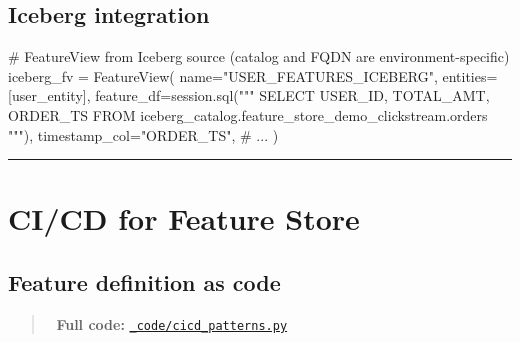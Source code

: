 \documentclass[
  letterpaper,
  DIV=11,
  numbers=noendperiod]{scrreprt}
\newenvironment{Shaded}{\begin{snugshade}}{\end{snugshade}}
\newcommand{\CommentTok}[1]{\textcolor[rgb]{0.37,0.37,0.37}{#1}}
\newcommand{\NormalTok}[1]{\textcolor[rgb]{0.00,0.23,0.31}{#1}}
\newcommand{\OperatorTok}[1]{\textcolor[rgb]{0.37,0.37,0.37}{#1}}
\newcommand{\StringTok}[1]{\textcolor[rgb]{0.13,0.47,0.30}{#1}}
\begin{document}
\hypertarget{iceberg-integration}{%
\subsection{Iceberg integration}\label{iceberg-integration}}

\begin{Shaded}
\begin{Highlighting}[]
\CommentTok{\# FeatureView from Iceberg source (catalog and FQDN are environment{-}specific)}
\NormalTok{iceberg\_fv }\OperatorTok{=}\NormalTok{ FeatureView(}
\NormalTok{    name}\OperatorTok{=}\StringTok{"USER\_FEATURES\_ICEBERG"}\NormalTok{,}
\NormalTok{    entities}\OperatorTok{=}\NormalTok{[user\_entity],}
\NormalTok{    feature\_df}\OperatorTok{=}\NormalTok{session.sql(}\StringTok{"""}
\StringTok{        SELECT USER\_ID, TOTAL\_AMT, ORDER\_TS}
\StringTok{        FROM iceberg\_catalog.feature\_store\_demo\_clickstream.orders}
\StringTok{    """}\NormalTok{),}
\NormalTok{    timestamp\_col}\OperatorTok{=}\StringTok{"ORDER\_TS"}\NormalTok{,}
    \CommentTok{\# ...}
\NormalTok{)}
\end{Highlighting}
\end{Shaded}

\begin{center}\rule{0.5\linewidth}{0.5pt}\end{center}

\hypertarget{cicd-for-feature-store}{%
\section{CI/CD for Feature Store}\label{cicd-for-feature-store}}

\hypertarget{feature-definition-as-code}{%
\subsection{Feature definition as
code}\label{feature-definition-as-code}}

\begin{quote}
📁 \textbf{Full code:}
\href{_code/cicd_patterns.py}{\texttt{\_code/cicd\_patterns.py}}
\end{quote}
\end{document}
